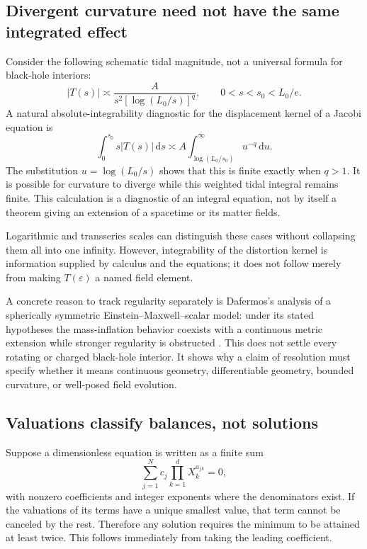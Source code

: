 \documentclass[11pt,a4paper]{article}
\numberwithin{equation}{section}
\theoremstyle{definition}
\theoremstyle{remark}
\newcommand{\eps}{\varepsilon}
\newcommand{\dd}{\mathrm d}
\begin{document}
\subsection{Divergent curvature need not have the same integrated effect}
Consider the following schematic tidal magnitude, not a universal formula for black-hole interiors:
\begin{equation}\label{eq:weaktide}
 |T(s)|\asymp \frac{A}{s^2[\log(L_0/s)]^q},\qquad 0<s<s_0<L_0/e.
\end{equation}
A natural absolute-integrability diagnostic for the displacement kernel of a Jacobi equation is
\begin{equation}\label{eq:weakintegral}
 \int_0^{s_0}s|T(s)|\,\dd s
 \asymp A\int_{\log(L_0/s_0)}^\infty u^{-q}\,\dd u.
\end{equation}
The substitution $u=\log(L_0/s)$ shows that this is finite exactly when $q>1$. It is possible for curvature to diverge while this weighted tidal integral remains finite. This calculation is a diagnostic of an integral equation, not by itself a theorem giving an extension of a spacetime or its matter fields.

Logarithmic and transseries scales can distinguish these cases without collapsing them all into one infinity. However, integrability of the distortion kernel is information supplied by calculus and the equations; it does not follow merely from making $T(\eps)$ a named field element.

A concrete reason to track regularity separately is Dafermos's analysis of a spherically symmetric Einstein--Maxwell--scalar model: under its stated hypotheses the mass-inflation behavior coexists with a continuous metric extension while stronger regularity is obstructed \cite{Dafermos}. This does not settle every rotating or charged black-hole interior. It shows why a claim of resolution must specify whether it means continuous geometry, differentiable geometry, bounded curvature, or well-posed field evolution.

\subsection{Valuations classify balances, not solutions}
Suppose a dimensionless equation is written as a finite sum
\begin{equation}
 \sum_{j=1}^N c_j\prod_{k=1}^d X_k^{a_{jk}}=0,
\end{equation}
with nonzero coefficients and integer exponents where the denominators exist. If the valuations of its terms have a unique smallest value, that term cannot be canceled by the rest. Therefore any solution requires the minimum to be attained at least twice. This follows immediately from taking the leading coefficient.
\end{document}
